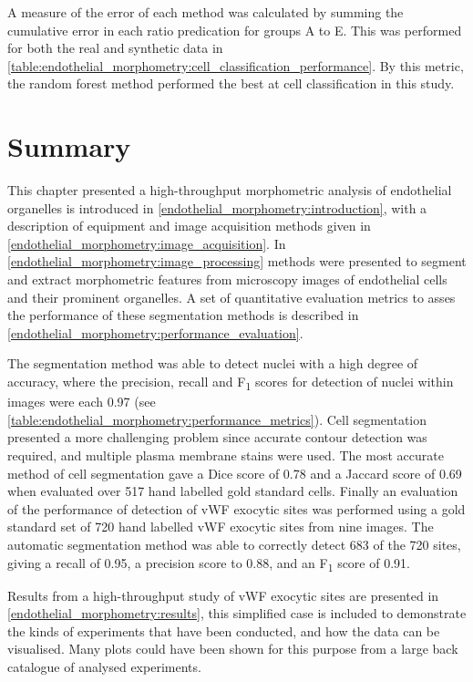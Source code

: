 A measure of the error of each method was calculated by summing the cumulative error in each ratio predication for groups A to E. This was performed for both the real and synthetic data in \autoref{table:endothelial_morphometry:cell_classification_performance}. By this metric, the random forest method performed the best at cell classification in this study.

\section{Summary}
\label{endothelial_morphometry:summary}
This chapter presented a high-throughput morphometric analysis of endothelial organelles is introduced in \autoref{endothelial_morphometry:introduction}, with a description of equipment and image acquisition methods given in \autoref{endothelial_morphometry:image_acquisition}. In \autoref{endothelial_morphometry:image_processing} methods were presented to segment and extract morphometric features from microscopy images of endothelial cells and their prominent organelles. A set of quantitative evaluation metrics to asses the performance of these segmentation methods is described in \autoref{endothelial_morphometry:performance_evaluation}.

The segmentation method was able to detect nuclei with a high degree of accuracy, where the precision, recall and F\textsubscript{1} scores for detection of nuclei within images were each 0.97 (see \autoref{table:endothelial_morphometry:performance_metrics}). Cell segmentation presented a more challenging problem since accurate contour detection was required, and multiple plasma membrane stains were used. The most accurate method of cell segmentation gave a Dice score of 0.78 and a Jaccard score of 0.69 when evaluated over 517 hand labelled gold standard cells. Finally an evaluation of the performance of detection of vWF exocytic sites was performed using a gold standard set of 720 hand labelled vWF exocytic sites from nine images. The automatic segmentation method was able to correctly detect 683 of the 720 sites, giving a recall of 0.95, a precision score to 0.88, and an F\textsubscript{1} score of 0.91.

Results from a high-throughput study of vWF exocytic sites are presented in \autoref{endothelial_morphometry:results}, this simplified case is included to demonstrate the kinds of experiments that have been conducted, and how the data can be visualised. Many plots could have been shown for this purpose from a large back catalogue of analysed experiments.

